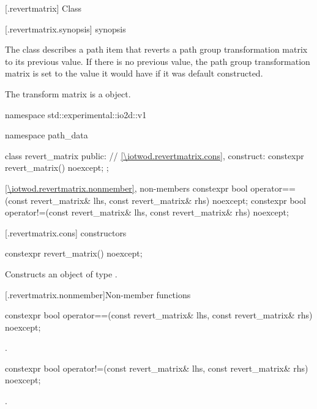  [\iotwod.revertmatrix] {Class }%

 [\iotwod.revertmatrix.synopsis] { synopsis}%

\pnum
{}%
The class  describes a path item that reverts a path group transformation matrix to its previous value. If there is no previous value, the path group transformation matrix is set to the value it would have if it was default constructed.

\pnum
The transform matrix is a  object.

\begin{codeblock}
namespace std::experimental::io2d::v1 {
  namespace path_data {
    class revert_matrix {
    public:
      // \ref{\iotwod.revertmatrix.cons}, construct:
      constexpr revert_matrix() noexcept;
    };
    
    \ref{\iotwod.revertmatrix.nonmember}, non-members
    constexpr bool operator==(const revert_matrix& lhs,
      const revert_matrix& rhs) noexcept;
    constexpr bool operator!=(const revert_matrix& lhs,
      const revert_matrix& rhs) noexcept;
  }
}
\end{codeblock}

 [\iotwod.revertmatrix.cons] { constructors}

%
\begin{itemdecl}
constexpr revert_matrix() noexcept;
\end{itemdecl}
\begin{itemdescr}
\pnum
\effects
Constructs an object of type .
\end{itemdescr}

 [\iotwod.revertmatrix.nonmember]{Non-member functions}

%
\begin{itemdecl}
constexpr bool operator==(const revert_matrix& lhs, const revert_matrix& rhs) 
  noexcept;
\end{itemdecl}
\begin{itemdescr}
\pnum
\returns
{}.
\end{itemdescr}

%
\begin{itemdecl}
constexpr bool operator!=(const revert_matrix& lhs, const revert_matrix& rhs) 
  noexcept;
\end{itemdecl}
\begin{itemdescr}
\pnum
\returns
{}.
\end{itemdescr}
